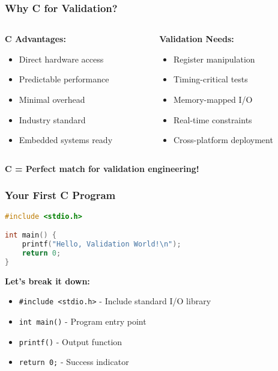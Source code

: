 \documentclass{beamer}
\begin{document}
\begin{frame}
\frametitle{Why C for Validation?}
\begin{columns}
\begin{column}{0.5\textwidth}
\textbf{C Advantages:}
\begin{itemize}
    \item Direct hardware access
    \item Predictable performance
    \item Minimal overhead
    \item Industry standard
    \item Embedded systems ready
\end{itemize}
\end{column}
\begin{column}{0.5\textwidth}
\textbf{Validation Needs:}
\begin{itemize}
    \item Register manipulation
    \item Timing-critical tests
    \item Memory-mapped I/O
    \item Real-time constraints
    \item Cross-platform deployment
\end{itemize}
\end{column}
\end{columns}

\vspace{0.5cm}
\begin{center}
\textbf{C = Perfect match for validation engineering!}
\end{center}
\end{frame}

\begin{frame}[fragile]
\frametitle{Your First C Program}
\begin{lstlisting}[language=C]
#include <stdio.h>

int main() {
    printf("Hello, Validation World!\n");
    return 0;
}
\end{lstlisting}

\textbf{Let's break it down:}
\begin{itemize}
    \item \texttt{\#include <stdio.h>} - Include standard I/O library
    \item \texttt{int main()} - Program entry point
    \item \texttt{printf()} - Output function
    \item \texttt{return 0;} - Success indicator
\end{itemize}
\end{frame}
\end{document}
